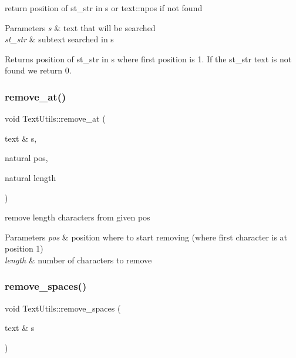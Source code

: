 return position of st\+\_\+str in s or text\+::npos if not found 
\begin{DoxyParams}{Parameters}
{\em s} & text that will be searched \\
\hline
{\em st\+\_\+str} & subtext searched in s \\
\hline
\end{DoxyParams}
\begin{DoxyReturn}{Returns}
position of st\+\_\+str in s where first position is 1. If the st\+\_\+str text is not found we return 0. 
\end{DoxyReturn}
\mbox{\label{classez_1_1essential_1_1TextUtils_aee82679b210251b3a50fe11533eda971}} 
\subsubsection{\texorpdfstring{remove\+\_\+at()}{remove\_at()}}
{\footnotesize\ttfamily void Text\+Utils\+::remove\+\_\+at (\begin{DoxyParamCaption}\item[{text \&}]{s,  }\item[{natural}]{pos,  }\item[{natural}]{length }\end{DoxyParamCaption})\hspace{0.3cm}{\ttfamily [static]}}

remove length characters from given pos 
\begin{DoxyParams}{Parameters}
{\em pos} & position where to start removing (where first character is at position 1) \\
\hline
{\em length} & number of characters to remove \\
\hline
\end{DoxyParams}
\mbox{\label{classez_1_1essential_1_1TextUtils_a3058d2e043d835d9f4325b7f57ee9ed7}} 
\subsubsection{\texorpdfstring{remove\+\_\+spaces()}{remove\_spaces()}}
{\footnotesize\ttfamily void Text\+Utils\+::remove\+\_\+spaces (\begin{DoxyParamCaption}\item[{text \&}]{s }\end{DoxyParamCaption})\hspace{0.3cm}{\ttfamily [static]}}

